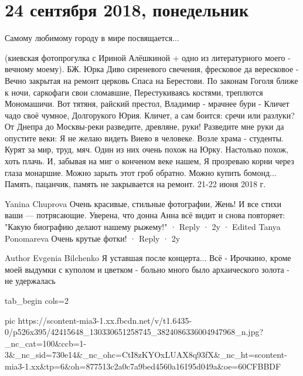  
 
 
 
 
\section{24 сентября 2018, понедельник}
\label{sec:24_09_2018}


Самому любимому городу в мире посвящается...

(киевская фотопрогулка с Ириной Алёшкиной + одно из литературного моего - вечному моему).
БЖ. Юрка
Диво сиреневого свечения, фресковое да вересковое -
Вечно закрытая на ремонт церковь Спаса на Берестови.
По законам Гоголя ближе к ночи, саркофаги свои сломавшие,
Перестукиваясь костями, треплются Мономашичи.
Вот тятяня, райский престол, Владимир - мрачнее бури -
Кличет чадо своё чумное, Долгорукого Юрия.
Кличет, а сам боится: сречи или разлуки?
От Днепра до Москвы-реки разведите, древляне, руки!
Разведите мне руки да опустите веки:
Я не желаю видеть Виево в человеке.
Возле храма - студенты. Курят за мир, труд, мяч.
Один из них очень похож на Юрку. 
Настолько похож, хоть плачь.
И, забывая на миг о конченом веке нашем,
Я прозреваю корни через глаза монаршие.
Можно зарыть этот гроб обратно. Можно купить бомонд...
Память, пацанчик, память не закрывается на ремонт.
21-22 июня 2018 г.

Yanina Chuprova
Очень красивые, стильные фотографии, Жень! И все стихи ваши — потрясающие. Уверена, что донна Анна всё видит и снова повторяет: "Какую биографию делают нашему рыжему!"
 · Reply · 2y · Edited
Tanya Ponomareva
Очень крутые фотки!
 · Reply · 2y

Author
Evgenia Bilchenko
Я уставшая после концерта... Всё - Ирочкино, кроме моей выдумки с куполом и цветком - больно много было архаического золота - не удержалась


\ifcmt
  tab_begin cols=2

     pic https://scontent-mia3-1.xx.fbcdn.net/v/t1.6435-0/p526x395/42415648_130330651258745_3824086336004947968_n.jpg?_nc_cat=100&ccb=1-3&_nc_sid=730e14&_nc_ohc=CtI8zKYOxLUAX8q93fX&_nc_ht=scontent-mia3-1.xx&tp=6&oh=877513c2a0c7a9bed4560a16195d049a&oe=60CFBBDF

